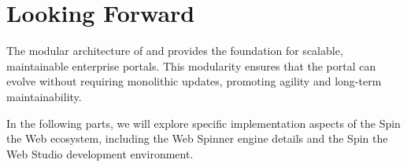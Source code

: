 \section{Looking Forward}
\label{sec:webbaselets-forward}

The modular architecture of  and  provides the foundation for scalable, maintainable enterprise portals. This modularity ensures that the portal can evolve without requiring monolithic updates, promoting agility and long-term maintainability.

In the following parts, we will explore specific implementation aspects of the Spin the Web ecosystem, including the Web Spinner engine details and the Spin the Web Studio development environment.
